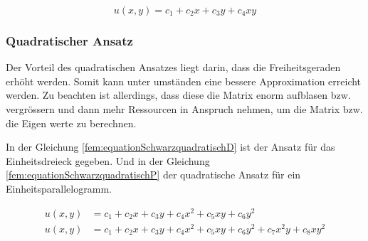 \begin{equation}
	u(x,y) = c_1 + c_2 x + c_3 y + c_4 xy
\end{equation} 


\subsubsection{Quadratischer Ansatz
\label{fem:subsection:bonorum}}

Der Vorteil des quadratischen Ansatzes liegt darin, dass die Freiheitsgeraden erhöht werden. Somit kann unter umständen eine bessere Approximation erreicht werden.
Zu beachten ist allerdings, dass diese die Matrix enorm aufblasen bzw. vergrössern und dann mehr Ressourcen in Anspruch nehmen, um die Matrix bzw. die Eigen werte zu berechnen.

In der Gleichung \ref{fem:equationSchwarzquadratischD}  ist der Ansatz für das Einheitsdreieck gegeben. Und in der Gleichung \ref{fem:equationSchwarzquadratischP} der quadratische Ansatz für ein Einheitsparallelogramm.

\begin{align}
	u(x,y) &= c_1 + c_2 x + c_3 y + c_4 x^2 + c_5 xy + c_6 y^2 \label{fem:equationSchwarzquadratischD} \\
	u(x,y) &= c_1 + c_2 x + c_3 y + c_4 x^2 + c_5 xy + c_6 y^2 + c_7 x^2y + c_8 xy^2 \label{fem:equationSchwarzquadratischP}
\end{align} 



